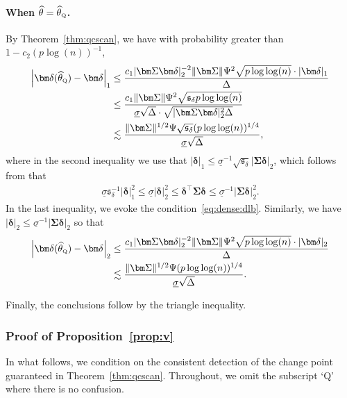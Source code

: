 \documentclass[11pt, a4paper]{article}
\renewcommand{\l}{\left}
\renewcommand{\r}{\right}
\def\wh{\widehat}
\newcommand{\cp}{\theta}
\newcommand{\Qc}{\text{\tiny \upshape Q}} %
\theoremstyle{definition}
\theoremstyle{definition}
\theoremstyle{definition}
\theoremstyle{definition}
\theoremstyle{definition}
\theoremstyle{remark}
\theoremstyle{definition}
\theoremstyle{definition}
\theoremstyle{definition}
\begin{document}
\paragraph{When $\wh\cp = \wh\cp_{\Qc}$.} By Theorem~\ref{thm:qcscan}, we have with probability greater than $1 - c_2 (p\log(n))^{-1}$,
\begin{align*}
\l\vert \bm\delta(\wh\cp_{\Qc}) - \bm\delta \r\vert_1 &\le \frac{c_1 \vert \bm\Sigma \bm\delta \vert_2^{-2} \Vert \bm\Sigma \Vert \Psi^2 \sqrt{p\log\log(n)} \cdot \vert \bm\delta \vert_1 }{ \Delta}
\\
&\le \frac{c_1 \Vert \bm\Sigma \Vert \Psi^2 \sqrt{\mathfrak{s}_{\delta} p \log\log(n)}}{\underline{\sigma} \sqrt{\Delta} \cdot \sqrt{\vert \bm\Sigma \bm\delta \vert_2^2 \Delta}} 
\\
&\lesssim \frac{\Vert \bm\Sigma \Vert^{1/2} \Psi \sqrt{\mathfrak{s}_\delta} (p\log\log(n))^{1/4}}{\underline{\sigma} \sqrt{\Delta}},
\end{align*}
where in the second inequality we use that $\vert \bm\delta \vert_1 \le \underline{\sigma}^{-1} \sqrt{\mathfrak{s}_\delta} \vert \bm\Sigma \bm\delta \vert_2$, which follows from that
\begin{align*}
\underline{\sigma} \mathfrak{s}_\delta^{-1} \vert \bm\delta \vert_1^2
\le \underline{\sigma} \vert \bm\delta \vert_2^2
\le \bm\delta^\top \bm\Sigma \bm\delta
\le \underline{\sigma}^{-1} \vert \bm\Sigma \bm\delta \vert_2^2.
\end{align*}
In the last inequality, we evoke the condition~\eqref{eq:dense:dlb}.
Similarly, we have $\vert \bm\delta \vert_2 \le \underline{\sigma}^{-1} \vert \bm\Sigma \bm\delta \vert_2$ so that
\begin{align*}
\l\vert \bm\delta(\wh\cp_{\Qc}) - \bm\delta \r\vert_2 &\le \frac{ c_1 \vert \bm\Sigma \bm\delta \vert_2^{-2} \Vert \bm\Sigma \Vert \Psi^2 \sqrt{p\log\log(n)} \cdot \vert \bm\delta \vert_2 }{\Delta}
\\
&\lesssim \frac{\Vert \bm\Sigma \Vert^{1/2} \Psi (p\log\log(n))^{1/4}}{\underline{\sigma} \sqrt{\Delta}}.
\end{align*}

Finally, the conclusions follow by the triangle inequality.

\subsubsection{Proof of Proposition~\ref{prop:v}}

In what follows, we condition on the consistent detection of the change point guaranteed in Theorem~\ref{thm:qcscan}.
Throughout, we omit the subscript `Q' where there is no confusion.
\end{document}
